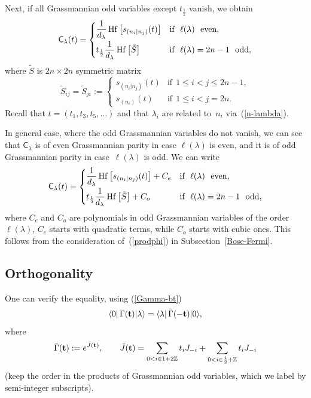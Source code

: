 \documentclass[pdftex]{sigma}
\numberwithin{equation}{section}
\newcommand{\Hf}{\mathop\mathrm{Hf}\nolimits}
\newcommand{\Z}{\mathbb{Z}}
\newcommand{\INZ}[2]{\in\frac#1#2 +\mathbb{Z}}
\newcommand{\C}{\textsf{C}_}
\newcommand{\G}{\Gamma}
\newcommand{\bt}{{\bf {t}}}
\renewcommand{\l}{\langle}
\renewcommand{\r}{\rangle}
\begin{document}
Next, if all Grassmannian odd variables  except $t_{\frac 12}$
vanish, we obtain
\[
 \textsf{C}_\lambda(t)=
 \begin{cases}
\dfrac{1}{d_\lambda} \Hf\big[
s_{(n_i|n_j)}(t)\big] &\mbox{if}\ \ \ell(\lambda)\ \ \mbox{even},\vspace{1mm}\\
t_{\frac 12} \dfrac{1}{d_\lambda} \Hf\big[ {\tilde S}\big]
&\mbox{if}\ \ \ell(\lambda)=2n-1 \ \ \mbox{odd},
 \end{cases}
\]
where ${\tilde S}$ is $2n \times 2n$ symmetric matrix
\[
{\tilde S}_{ij}={\tilde S}_{ji}:=
\begin{cases}
s_{(n_i|n_j)}(t) &\mbox{if}\ \ 1\le i<j \le 2n-1 , \\
s_{(n_i)}(t) &\mbox{if}\ \ 1\le i < j=2n .
 \end{cases}
\]
Recall that $t=(t_1,t_3,t_5,\dots)$ and that $\lambda_i$
are related to~$n_i$ via~(\ref{n-lambda}).

In general case, where the odd Grassmannian variables do not vanish,
we can see that $\C\lambda$ is of even Grassmannian parity in case
$\ell(\lambda)$ is even, and it is of odd Grassmannian parity in
case~$\ell(\lambda)$ is odd. We can write
\[
 \textsf{C}_\lambda(t)=
 \begin{cases}
\dfrac{1}{d_\lambda} \Hf\big[
s_{(n_i|n_j)}(t)\big]+C_{e} &\mbox{if}\ \ \ell(\lambda)\ \ \mbox{even},\vspace{1mm}\\
t_{\frac 12} \dfrac{1}{d_\lambda} \Hf\big[ {\tilde
S}\big]+C_{o} &\mbox{if}\ \ \ell(\lambda)=2n-1 \ \
\mbox{odd},
 \end{cases}
\]
 where $C_{e}$ and $C_{o}$ are polynomials in odd Grassmannian
 variables of the order~$\ell(\lambda)$, $C_{e}$ starts with
 quadratic terms, while $C_{o}$ starts with cubic ones. This
 follows from the consideration of~(\ref{prodphi}) in Subsection~\ref{Bose-Fermi}.


\subsection{Orthogonality}

 One can verify the equality, using (\ref{Gamma-bt})
 \begin{gather}\label{C-right-left}
\l 0|\,{\G}({\bt})|\lambda \r  =  \l \lambda|\,{\bar
\G}(-{\bt})| 0 \r,
 \end{gather}
where
 \begin{gather}\label{barGamma-bt}
{\bar\Gamma}({ \bt}):=e^{{\bar J}({\bf t})}  ,\qquad {\bar
J}({\bf t}) =  \sum_{0< i\in 1+2\Z}t_i J_{-i}+\sum_{0<
i\INZ12}   t_i J_{-i}
  \end{gather}
(keep the order in the products of Grassmannian odd variables,
which we label by semi-integer subscripts).
\end{document}
